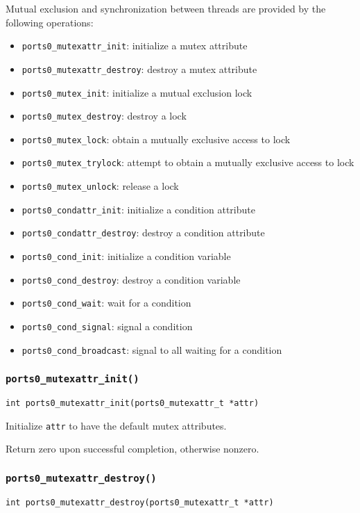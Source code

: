 Mutual exclusion and synchronization between threads are provided by
the following operations:
\begin{itemize}
\item {\tt ports0\_mutexattr\_init}: initialize a mutex attribute
\item {\tt ports0\_mutexattr\_destroy}: destroy a mutex attribute
\item {\tt ports0\_mutex\_init}: initialize a mutual exclusion lock
\item {\tt ports0\_mutex\_destroy}: destroy a lock
\item {\tt ports0\_mutex\_lock}: obtain a mutually exclusive access to lock
\item {\tt ports0\_mutex\_trylock}: attempt to obtain a mutually
exclusive access to lock
\item {\tt ports0\_mutex\_unlock}: release a lock
\item {\tt ports0\_condattr\_init}: initialize a condition attribute
\item {\tt ports0\_condattr\_destroy}: destroy a condition attribute
\item {\tt ports0\_cond\_init}: initialize a condition variable
\item {\tt ports0\_cond\_destroy}: destroy a condition variable
\item {\tt ports0\_cond\_wait}: wait for a condition
\item {\tt ports0\_cond\_signal}: signal a condition
\item {\tt ports0\_cond\_broadcast}: signal to all waiting for a condition
\end{itemize}


\subsubsection{\tt ports0\_mutexattr\_init()}
\begin{verbatim}
int ports0_mutexattr_init(ports0_mutexattr_t *attr)
\end{verbatim}

Initialize {\tt attr} to have the default mutex attributes.

Return zero upon successful completion, otherwise nonzero.


\subsubsection{\tt ports0\_mutexattr\_destroy()}
\begin{verbatim}
int ports0_mutexattr_destroy(ports0_mutexattr_t *attr)
\end{verbatim}

